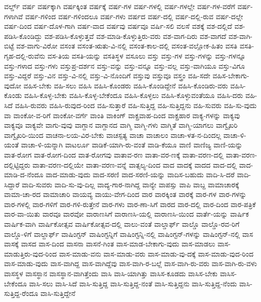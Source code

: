 {ವರ್ಲ್ಡ್
ವರ್ಷ
ವರ್ಷಕ್ಕಾಗಿ
ವರ್ಷಕ್ಕಿಂತ
ವರ್ಷಕ್ಕೆ
ವರ್ಷ-ಗಳ
ವರ್ಷ-ಗಳಲ್ಲಿ
ವರ್ಷ-ಗಳಲ್ಲೇ
ವರ್ಷ-ಗಳ-ವರೆಗೆ
ವರ್ಷ-ಗಳಾಗಿವೆ
ವರ್ಷ-ಗಳಿಂದ
ವರ್ಷ-ಗಳಿಂದಲೂ
ವರ್ಷ-ಗಳು
ವರ್ಷದ
ವರ್ಷ-ದಲ್ಲಿ
ವರ್ಷ-ದಲ್ಲಿ-ರುವ
ವರ್ಷ-ದಲ್ಲೇ
ವರ್ಷ-ದಿಂದ
ವರ್ಷ-ದೊಳ-ಗಾಗಿ
ವರ್ಷ-ವಾದ
ವರ್ಷವು
ವರ್ಷವೂ
ವರ್ಷಿ-ಸಲಿ
ವಲಸೆ
ವಶಕ್ಕೆ
ವಶ-ದಲ್ಲಿದೆ
ವಶ-ಪಡಿಸಿ-ಕೊಂಡಿದ್ದು
ವಶ-ಪಡಿಸಿ-ಕೊಳ್ಳುತ್ತವೆ
ವಶ-ಮಾಡಿ-ಕೊಳ್ಳುತ್ತಿರು-ವರು
ವಶ-ವಾಗ-ದಿರು
ವಶ-ವಾಗದೆ
ವಶ-ವಾಗಿ-ಬಿಟ್ಟೆ
ವಶ-ವಾಗು-ವಿರೋ
ವಸಂತ
ವಸಂತ-ಋತು-ವಿ-ನಲ್ಲಿ
ವಸಂತ-ಕಾಲ-ದಲ್ಲಿ
ವಸಂತ-ವಲ್ಲೋಕ-ಹಿತಂ
ವಸತಿ
ವಸತಿ-ಗೃಹ-ದಲ್ಲಿ-ರುವೆನು
ವಸ-ತಿಯ
ವಸತಿ-ಯನ್ನು
ವಸತಿಸ್ಥಳ
ವಸೂಲು
ವಸ್ತು
ವಸ್ತು-ಗಳ
ವಸ್ತು-ಗಳನ್ನು
ವಸ್ತು-ಗಳನ್ನೂ
ವಸ್ತು-ಗಳಾದ
ವಸ್ತು-ಗಳು
ವಸ್ತುಪ್ರ-ದರ್ಶನ
ವಸ್ತು-ವನ್ನು
ವಸ್ತು-ವನ್ನೂ
ವಸ್ತು-ವಲ್ಲ
ವಸ್ತು-ವಾಗಿಯೂ
ವಸ್ತು-ವಿಗೂ
ವಸ್ತು-ವಿದ್ದರೆ
ವಸ್ತು-ವಿನ
ವಸ್ತು-ವಿ-ನಲ್ಲಿ
ವಸ್ತು-ವಿ-ನೊಂದಿಗೆ
ವಸ್ತುವು
ವಸ್ತುವೂ
ವಸ್ತ್ರಂ
ವಹಿ-ಸದೇ
ವಹಿಸ-ಬೇಕಾಗು-ವುದೋ
ವಹಿಸ-ಬೇಕು
ವಹಿ-ಸಲು
ವಹಿಸಿ
ವಹಿಸಿ-ಕೊಂಡರು
ವಹಿಸಿ-ಕೊಂಡಿದ್ದೇನೆ
ವಹಿಸಿ-ಕೊಂಡಿರು-ವರು
ವಹಿಸಿ-ಕೊಂಡು
ವಹಿಸಿ-ಕೊಳ್ಳ-ಬೇಕು
ವಹಿಸಿ-ಕೊಳ್ಳ-ಬೇಕೆಂದೂ
ವಹಿಸಿ-ಕೊಳ್ಳಲು
ವಹಿಸಿ-ಕೊಳ್ಳುವಂತೆಯೂ
ವಹಿಸಿ-ದರು
ವಹಿ-ಸಿದೆ
ವಹಿಸಿ-ರುವರು
ವಹಿಸಿ-ರುವುದ-ರಿಂದ
ವಹಿ-ಸುತ್ತಾರೆ
ವಹಿ-ಸುತ್ತಿದ್ದ
ವಹಿ-ಸುತ್ತಿದ್ದನು
ವಹಿ-ಸುವರು
ವಹಿ-ಸು-ವುದು
ವಾ
ವಾಂಕೋ-ವ-ರಿಗೆ
ವಾಂಕೋ-ವರ್ಗೆ
ವಾಂತಿ
ವಾಕಿಂಗ್
ವಾಕ್ಪ್ರವಾಹ-ದಿಂದ
ವಾಕ್ಪ್ರಹಾರ
ವಾಕ್ಯ-ಗಳನ್ನು
ವಾಕ್ಯವು
ವಾಕ್ಯವೂ
ವಾಕ್ಯವೇ
ವಾಗು-ವುವು
ವಾಗ್ದಾನ
ವಾಗ್ದಾನದ
ವಾಗ್ಮಿ
ವಾಗ್ಮಿ-ಗಳು
ವಾಗ್ಮಿತೆ
ವಾಗ್ಮಿ-ಯಾಗಲು
ವಾಗ್ವೈಖರಿ
ವಾಗ್ವೈಖರಿ-ಯಿಂದ
ವಾಚನಾ-ಲಯ-ವಿರ-ಬೇಕು
ವಾಚಸ್ಪತ್ಯ
ವಾಚಾ
ವಾಚಾಲಂ
ವಾಚಾ-ಳತ-ನ-ದಿಂದಲ್ಲ
ವಾಚಾ-ಳಿ-ಯಂತೆ
ವಾಚಾ-ಳಿ-ಯನ್ನಾಗಿ
ವಾಟರ್ಲೂ
ವಾಡಿಕೆ-ಯಾಗಿ-ರು-ವಂತೆ
ವಾಡಿ-ಕೆಯೂ
ವಾಣಿ
ವಾಣಿಜ್ಯ
ವಾಣಿ-ಯನ್ನು
ವಾತ-ರೋಗ
ವಾತ-ರೋಗ-ದಿಂದ
ವಾತ-ರೋಗವು
ವಾತಾವ-ರಣ
ವಾತಾ-ವರ-ಣಕ್ಕೆ
ವಾತಾ-ವರಣ-ದಲ್ಲಿ
ವಾತಾ-ವರಣ-ದಲ್ಲಿಟ್ಟಿದ್ದರು
ವಾತಾ-ವರಣ-ದಲ್ಲಿಯೇ
ವಾತಾ-ವರಣ-ವನ್ನೆ
ವಾತ್ಸಲ್ಯ-ದಿಂದ
ವಾದ
ವಾದಕ್ಕೆ
ವಾದದ
ವಾದ-ದಲ್ಲಿ
ವಾದ-ಮಾಡಿ-ದ-ನೆಂದೂ
ವಾದ-ಮಾಡು-ವುದು
ವಾದ-ಸರಣಿ
ವಾದ-ಸರಣಿ-ಯನ್ನು
ವಾದಿಸ-ಬಹುದು
ವಾದಿ-ಸಿ-ದರೆ
ವಾದಿ-ಸಿದ್ದಾರೆ
ವಾದಿ-ಸುವರು
ವಾದಿ-ಸು-ವು-ದಿಲ್ಲ
ವಾದ್ಯ-ಗಾರ-ನಾಗಿದ್ದ
ವಾನ್ಯೇ
ವಾಪಸ್ಸು
ವಾಪಿ
ವಾಬ್ದ
ವಾಮಾಚಾರಕ್ಕೆ
ವಾಮಾ-ಚಾ-ರದ
ವಾಮಾಚಾರಿ
ವಾಯವ್ಯ
ವಾಯು-ವೇಗ-ದಿಂದ
ವಾರ
ವಾರಕ್ಕಿಂತ
ವಾರಕ್ಕೆ
ವಾರ-ಗಳ
ವಾರ-ಗಳನ್ನು
ವಾರ-ಗಳಲ್ಲಿ
ವಾರ-ಗಳಿಗೆ
ವಾರ-ಗಳಿ-ರುತ್ತೇನೆ
ವಾರ-ಗಳು
ವಾರ-ಣಾ-ಸಿಗೆ
ವಾರದ
ವಾರ-ದಲ್ಲಿ
ವಾರ-ದಿಂದ
ವಾರ-ಪತ್ರಿಕೆ
ವಾರ-ವಾ-ಯಿತು
ವಾರವೂ
ವಾರವೋ
ವಾರಾಣಸಿಗೆ
ವಾರಾಣಸಿ-ಯಲ್ಲಿ
ವಾರಾಣಸಿ-ಯಿಂದ
ವಾರ್ತೆ-ಯನ್ನು
ವಾರ್ಷಿಕ
ವಾರ್ಷಿಕ-ವಾಗಿ
ವಾರ್ಷಿಕೋತ್ಸವ
ವಾರ್ಷಿಕೋತ್ಸವ-ದಲ್ಲಿ
ವಾಲು-ವಂತೆ
ವಾಲ್ಡಾರ್ಫ್
ವಾಲ್ಡೊ
ವಾಲ್ಡೊ-ರವ-ರಿಗೆ
ವಾಲ್ಡೊ-ಳಿಗೆ
ವಾಲ್ದಾರ್ಫ್
ವಾಷಿಂಗ್ಟನ್
ವಾಷಿಂಗ್ಟನ್ನಿಗೆ
ವಾಷಿಂಗ್ಟನ್ನಿ-ನಲ್ಲಿ
ವಾಷಿಂಗ್ಟನ್-ಗಳನ್ನು
ವಾಷಿಂಗ್ಟನ್-ನಲ್ಲಿ
ವಾಸ
ವಾಸಕ್ಕೆ
ವಾಸದ
ವಾಸ-ದಿಂದ
ವಾಸನಾ
ವಾಸನೆ-ಗಿಂತ
ವಾಸ-ಮಾಡ-ಬೇಕಾಗು-ವುದು
ವಾಸ-ಮಾಡಲು
ವಾಸ-ಮಾಡುತ್ತಿರು-ವುದ-ರಿಂದ
ವಾಸ-ಮಾಡು-ವನು
ವಾಸ-ಮಾಡು-ವರು
ವಾಸ-ಮಾಡು-ವು-ದಕ್ಕೆ
ವಾಸ-ಮಾಡು-ವುದ-ರಿಂದ
ವಾಸ-ಮಾಡು-ವುದು
ವಾಸ-ವಾಗಿದ್ದ
ವಾಸ-ವಾಗಿದ್ದೆವು
ವಾಸ-ವಾಗಿ-ರ-ಬಲ್ಲೆ
ವಾಸ-ವಾಗಿ-ರು-ವರು
ವಾಸ-ವಾಗಿ-ರು-ವಳು
ವಾಸಸ್ಥಳ
ವಾಸಸ್ಥಾನ
ವಾಸಸ್ಥಾನ-ವಾಗಿತ್ತೆಂದು
ವಾಸಿ
ವಾಸಿ-ಯಾಗಿತ್ತು
ವಾಸಿಸ-ಕೂಡದು
ವಾಸಿಸ-ಬೇಕು
ವಾಸಿಸ-ಬೇಕೆಂದೂ
ವಾಸಿ-ಸಲು
ವಾಸಿ-ಸಿದೆ
ವಾಸಿ-ಸುತ್ತಿದ್ದ
ವಾಸಿ-ಸುತ್ತಿದ್ದ-ನಂತೆ
ವಾಸಿ-ಸುತ್ತಿದ್ದನು
ವಾಸಿ-ಸುತ್ತಿದ್ದ-ನೆಂದು
ವಾಸಿ-ಸುತ್ತಿದ್ದ-ರೆಂದೂ
ವಾಸಿ-ಸುತ್ತಿದ್ದೇನೆ
}
